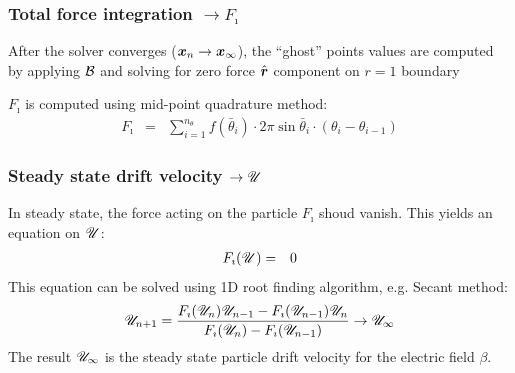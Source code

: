 \subsubsection{Total force integration $\rightarrow F_\imath$}
After the solver converges ($\boldsymbol{x}_n \rightarrow \boldsymbol{x}_\infty$), 
the ``ghost'' points values are computed by applying $\mathcal{B}$ and
solving for zero force  $\hat{\boldsymbol{r}}$ component on $r=1$ boundary

$F_\imath$ is computed using mid-point quadrature method:
\begin{eqnarray}
F_\imath &=& \sum_{i=1}^{n_\theta} f(\bar\theta_i) \cdot 
              2 \pi \sin\bar\theta_i \cdot (\theta_i - \theta_{i-1})
\end{eqnarray}

\subsubsection{Steady state drift velocity $\rightarrow \mathscr{U}$}
In steady state, the force acting on the particle $F_\imath$ shoud vanish.
This yields an equation on $\mathscr{U}$:
\begin{eqnarray}
F_\imath(\mathscr{U}) &=& 0
\end{eqnarray}
This equation can be solved using 1D root finding algorithm, e.g. Secant method:
\begin{eqnarray}
\mathscr{U}_{n+1} = \frac{F_\imath(\mathscr{U}_{n})\mathscr{U}_{n-1} - F_\imath(\mathscr{U}_{n-1})\mathscr{U}_{n}}
{F_\imath(\mathscr{U}_{n}) - F_\imath(\mathscr{U}_{n-1})} \rightarrow \mathscr{U}_\infty
\end{eqnarray}
The result $\mathscr{U}_\infty$ is the 
steady state particle drift velocity for the electric field $\beta$.

